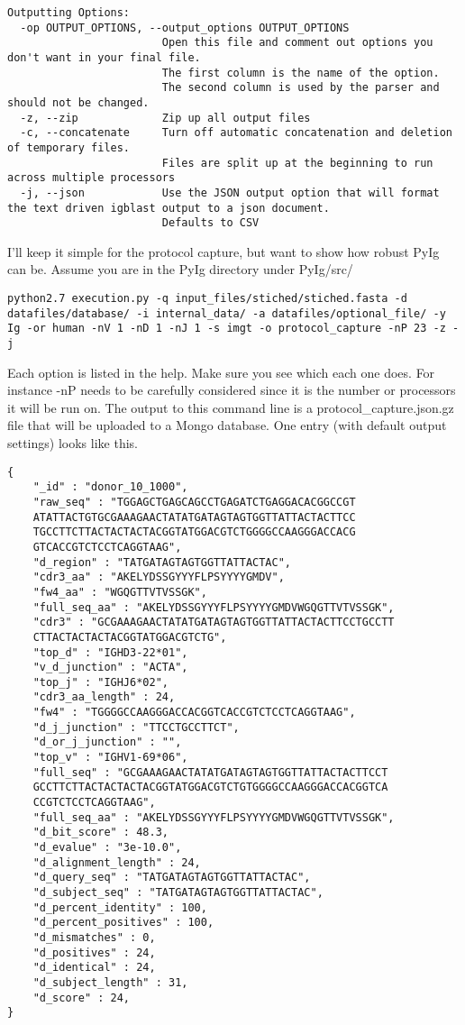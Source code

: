 \begin{lstlisting}[breaklines=true]
Outputting Options:
  -op OUTPUT_OPTIONS, --output_options OUTPUT_OPTIONS
                        Open this file and comment out options you don't want in your final file.
                        The first column is the name of the option.
                        The second column is used by the parser and should not be changed.
  -z, --zip             Zip up all output files
  -c, --concatenate     Turn off automatic concatenation and deletion of temporary files.
                        Files are split up at the beginning to run across multiple processors
  -j, --json            Use the JSON output option that will format the text driven igblast output to a json document.
                        Defaults to CSV
\end{lstlisting}


I'll keep it simple for the protocol capture, but want to show how robust PyIg can be. Assume you are in the PyIg directory under PyIg/src/

\begin{lstlisting}[breaklines=true]
python2.7 execution.py -q input_files/stiched/stiched.fasta -d datafiles/database/ -i internal_data/ -a datafiles/optional_file/ -y Ig -or human -nV 1 -nD 1 -nJ 1 -s imgt -o protocol_capture -nP 23 -z -j
\end{lstlisting}

Each option is listed in the help. Make sure you see which each one does. For instance -nP needs to be carefully considered since it is the number or processors it will be run on. The output to this command line is a protocol\_capture.json.gz file that will be uploaded to a Mongo database. One entry (with default output settings) looks like this.

\begin{lstlisting}[breaklines=true]
{
    "_id" : "donor_10_1000",
    "raw_seq" : "TGGAGCTGAGCAGCCTGAGATCTGAGGACACGGCCGT
    ATATTACTGTGCGAAAGAACTATATGATAGTAGTGGTTATTACTACTTCC
    TGCCTTCTTACTACTACTACGGTATGGACGTCTGGGGCCAAGGGACCACG
    GTCACCGTCTCCTCAGGTAAG",
    "d_region" : "TATGATAGTAGTGGTTATTACTAC",
    "cdr3_aa" : "AKELYDSSGYYYFLPSYYYYGMDV",
    "fw4_aa" : "WGQGTTVTVSSGK",
    "full_seq_aa" : "AKELYDSSGYYYFLPSYYYYGMDVWGQGTTVTVSSGK",
    "cdr3" : "GCGAAAGAACTATATGATAGTAGTGGTTATTACTACTTCCTGCCTT
    CTTACTACTACTACGGTATGGACGTCTG",
    "top_d" : "IGHD3-22*01",
    "v_d_junction" : "ACTA",
    "top_j" : "IGHJ6*02",
    "cdr3_aa_length" : 24,
    "fw4" : "TGGGGCCAAGGGACCACGGTCACCGTCTCCTCAGGTAAG",
    "d_j_junction" : "TTCCTGCCTTCT",
    "d_or_j_junction" : "",
    "top_v" : "IGHV1-69*06",
    "full_seq" : "GCGAAAGAACTATATGATAGTAGTGGTTATTACTACTTCCT
    GCCTTCTTACTACTACTACGGTATGGACGTCTGTGGGGCCAAGGGACCACGGTCA
    CCGTCTCCTCAGGTAAG",
    "full_seq_aa" : "AKELYDSSGYYYFLPSYYYYGMDVWGQGTTVTVSSGK",
    "d_bit_score" : 48.3,
    "d_evalue" : "3e-10.0",
    "d_alignment_length" : 24,
    "d_query_seq" : "TATGATAGTAGTGGTTATTACTAC",
    "d_subject_seq" : "TATGATAGTAGTGGTTATTACTAC",
    "d_percent_identity" : 100,
    "d_percent_positives" : 100,
    "d_mismatches" : 0,
    "d_positives" : 24,
    "d_identical" : 24,
    "d_subject_length" : 31,
    "d_score" : 24,
}
\end{lstlisting}

